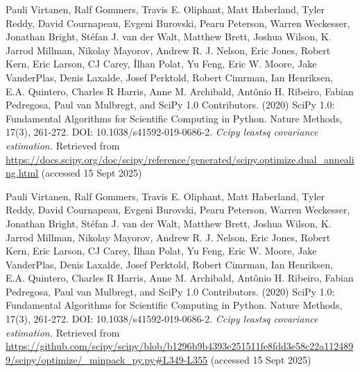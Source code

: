 \documentclass[11pt,a4paper]{article}
\begin{document}
\begin{thebibliography}{99}
Pauli Virtanen, Ralf Gommers, Travis E. Oliphant, Matt Haberland, Tyler Reddy, David Cournapeau, Evgeni Burovski, Pearu Peterson, Warren Weckesser, Jonathan Bright, Stéfan J. van der Walt, Matthew Brett, Joshua Wilson, K. Jarrod Millman, Nikolay Mayorov, Andrew R. J. Nelson, Eric Jones, Robert Kern, Eric Larson, CJ Carey, İlhan Polat, Yu Feng, Eric W. Moore, Jake VanderPlas, Denis Laxalde, Josef Perktold, Robert Cimrman, Ian Henriksen, E.A. Quintero, Charles R Harris, Anne M. Archibald, Antônio H. Ribeiro, Fabian Pedregosa, Paul van Mulbregt, and SciPy 1.0 Contributors. (2020) SciPy 1.0: Fundamental Algorithms for Scientific Computing in Python. Nature Methods, 17(3), 261-272. DOI: 10.1038/s41592-019-0686-2. \textit{Ccipy leastsq covariance estimation.}
Retrieved from 
\url{https://docs.scipy.org/doc/scipy/reference/generated/scipy.optimize.dual_annealing.html} (accessed 15 Sept 2025)

Pauli Virtanen, Ralf Gommers, Travis E. Oliphant, Matt Haberland, Tyler Reddy, David Cournapeau, Evgeni Burovski, Pearu Peterson, Warren Weckesser, Jonathan Bright, Stéfan J. van der Walt, Matthew Brett, Joshua Wilson, K. Jarrod Millman, Nikolay Mayorov, Andrew R. J. Nelson, Eric Jones, Robert Kern, Eric Larson, CJ Carey, İlhan Polat, Yu Feng, Eric W. Moore, Jake VanderPlas, Denis Laxalde, Josef Perktold, Robert Cimrman, Ian Henriksen, E.A. Quintero, Charles R Harris, Anne M. Archibald, Antônio H. Ribeiro, Fabian Pedregosa, Paul van Mulbregt, and SciPy 1.0 Contributors. (2020) SciPy 1.0: Fundamental Algorithms for Scientific Computing in Python. Nature Methods, 17(3), 261-272. DOI: 10.1038/s41592-019-0686-2. \textit{Ccipy leastsq covariance estimation.}
Retrieved from \url{https://github.com/scipy/scipy/blob/b1296b9b4393e251511fe8fdd3e58c22a1124899/scipy/optimize/_minpack_py.py#L349-L355} (accessed 15 Sept 2025)

\end{thebibliography}
\end{document}
